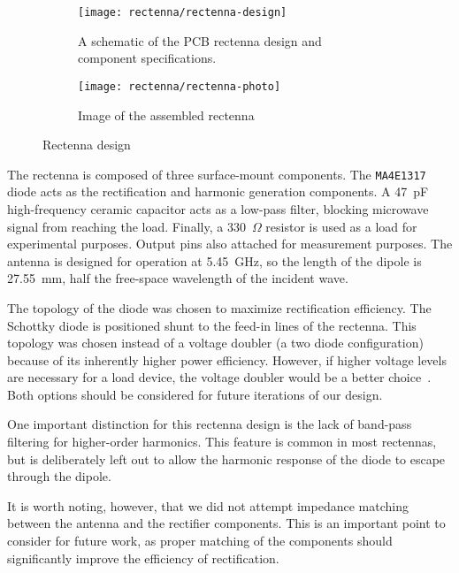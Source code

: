 \begin{figure}[]
    \centering
    \begin{subfigure}{.85\textwidth}
        \centering
        \texttt{[image: rectenna/rectenna-design]}
        \caption[Rectenna schematica]{A schematic of the PCB rectenna design and component specifications.}
    \end{subfigure}
		\par\bigskip
    \begin{subfigure}{.85\textwidth}
        \centering
        \texttt{[image: rectenna/rectenna-photo]}
        \caption[Assembled rectenna photo]{Image of the assembled rectenna}
    \end{subfigure}
    \caption[Rectenna design]{Rectenna design}
    \label{fig:rectenna-design}
\end{figure}

The rectenna is composed of three surface-mount components. The \texttt{MA4E1317} diode acts as the rectification and harmonic generation components. A 47~pF high-frequency ceramic capacitor acts as a low-pass filter, blocking microwave signal from reaching the load. Finally, a 330~$\Omega$ resistor is used as a load for experimental purposes. Output pins also attached for measurement purposes. The antenna is designed for operation at 5.45~GHz, so the length of the dipole is 27.55~mm, half the free-space wavelength of the incident wave.

The topology of the diode was chosen to maximize rectification efficiency. The Schottky diode is positioned shunt to the feed-in lines of the rectenna. This topology was chosen instead of a voltage doubler (a two diode configuration) because of its inherently higher power efficiency. However, if higher voltage levels are necessary for a load device, the voltage doubler would be a better choice~\cite{boaventura2015boosting}. Both options should be considered for future iterations of our design.

One important distinction for this rectenna design is the lack of band-pass filtering for higher-order harmonics. This feature is common in most rectennas, but is deliberately left out to allow the harmonic response of the diode to escape through the dipole.

It is worth noting, however, that we did not attempt impedance matching between the antenna and the rectifier components. This is an important point to consider for future work, as proper matching of the components should significantly improve the efficiency of rectification.

